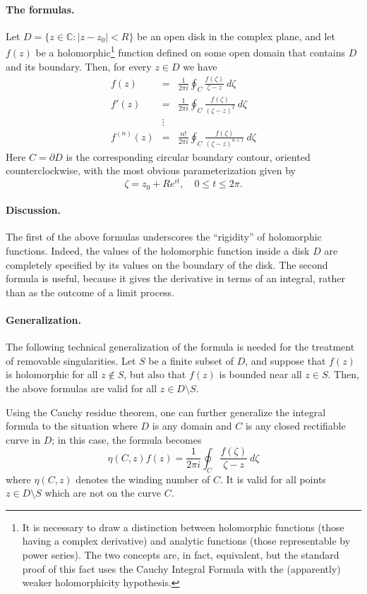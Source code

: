 \documentclass[12pt]{article}
\begin{document}
\paragraph{The formulas.}
Let $D=\{z\in\mathbb{C} : |z-z_0| <R\}$ be an open disk in the
complex plane, and let $f(z)$ be a holomorphic\footnote{It is
  necessary to draw a distinction between holomorphic functions (those having
  a complex derivative) and analytic functions (those representable by
  power series).  The two concepts are, in fact, equivalent, but
  the standard proof of this fact uses the Cauchy Integral Formula
  with the (apparently) weaker holomorphicity hypothesis.} function
defined on some open domain that contains $D$ and its boundary.  Then,
for every $z\in D$ we have
\begin{eqnarray*}
f(z) &=& \frac{1}{2 \pi i} \oint_C \frac{f(\zeta)}{\zeta-z}\ d\zeta \\
f'(z) &=& \frac{1}{2 \pi i} \oint_C \frac{f(\zeta)}{(\zeta-z)^2}\ d\zeta \\
& \vdots & \\
f^{(n)}(z) &=& \frac{n!}{2 \pi i} \oint_C \frac{f(\zeta)}{(\zeta-z)^{n+1}}\ d\zeta  
\end{eqnarray*}
Here $C=\partial D$ is the corresponding circular boundary contour,
oriented counterclockwise, with the most obvious parameterization
given by
$$\zeta=z_0+R e^{it},\quad 0\leq t\leq 2\pi.$$

\paragraph{Discussion.}
The first of the above formulas underscores the ``rigidity'' of
holomorphic functions.  Indeed, the values of the holomorphic function
inside a disk $D$ are completely specified by its values on the
boundary of the disk.  The second formula is useful, because it gives
the derivative in terms of an integral, rather than as the outcome of
a limit process.

\paragraph{Generalization.}
The following technical generalization of the formula is needed for
the treatment of removable singularities.  Let $S$ be a finite subset
of $D$, and suppose that  $f(z)$ is holomorphic for all $z\notin
 S$, but also that
$f(z)$ is bounded near all $z\in S$.  Then, the
above formulas are valid for all $z\in D\setminus S$.

Using the Cauchy residue theorem, one can further generalize the integral formula to the situation where $D$ is any domain and $C$ is any closed rectifiable curve in $D$; in this case, the formula becomes
$$
\eta(C,z) f(z) = \frac{1}{2 \pi i} \oint_C \frac{f(\zeta)}{\zeta-z}\ d\zeta
$$
where $\eta(C,z)$ denotes the winding number of $C$. It is valid for all points $z \in D \setminus S$ which are not on the curve $C$.
\end{document}
